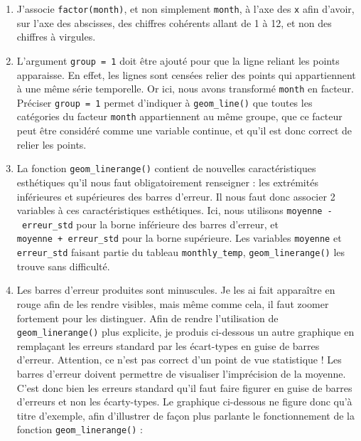 \documentclass[
  a4paper,
]{article}
\providecommand{\tightlist}{%
  \setlength{\itemsep}{0pt}\setlength{\parskip}{0pt}}
\begin{document}
\begin{enumerate}
\def\labelenumi{\arabic{enumi}.}
\tightlist
\item
  J'associe \texttt{factor(month)}, et non simplement \texttt{month}, à l'axe des \texttt{x} afin d'avoir, sur l'axe des abscisses, des chiffres cohérents allant de 1 à 12, et non des chiffres à virgules.
\item
  L'argument \texttt{group\ =\ 1} doit être ajouté pour que la ligne reliant les points apparaisse. En effet, les lignes sont censées relier des points qui appartiennent à une même série temporelle. Or ici, nous avons transformé \texttt{month} en facteur. Préciser \texttt{group\ =\ 1} permet d'indiquer à \texttt{geom\_line()} que toutes les catégories du facteur \texttt{month} appartiennent au même groupe, que ce facteur peut être considéré comme une variable continue, et qu'il est donc correct de relier les points.
\item
  La fonction \texttt{geom\_linerange()} contient de nouvelles caractéristiques esthétiques qu'il nous faut obligatoirement renseigner : les extrémités inférieures et supérieures des barres d'erreur. Il nous faut donc associer 2 variables à ces caractéristiques esthétiques. Ici, nous utilisons \texttt{moyenne\ -\ erreur\_std} pour la borne inférieure des barres d'erreur, et \texttt{moyenne\ +\ erreur\_std} pour la borne supérieure. Les variables \texttt{moyenne} et \texttt{erreur\_std} faisant partie du tableau \texttt{monthly\_temp}, \texttt{geom\_linerange()} les trouve sans difficulté.
\item
  Les barres d'erreur produites sont minuscules. Je les ai fait apparaître en rouge afin de les rendre visibles, mais même comme cela, il faut zoomer fortement pour les distinguer. Afin de rendre l'utilisation de \texttt{geom\_linerange()} plus explicite, je produis ci-dessous un autre graphique en remplaçant les erreurs standard par les écart-types en guise de barres d'erreur. Attention, ce n'est pas correct d'un point de vue statistique ! Les barres d'erreur doivent permettre de visualiser l'imprécision de la moyenne. C'est donc bien les erreurs standard qu'il faut faire figurer en guise de barres d'erreurs et non les écarty-types. Le graphique ci-dessous ne figure donc qu'à titre d'exemple, afin d'illustrer de façon plus parlante le fonctionnement de la fonction \texttt{geom\_linerange()} :
\end{enumerate}
\end{document}
